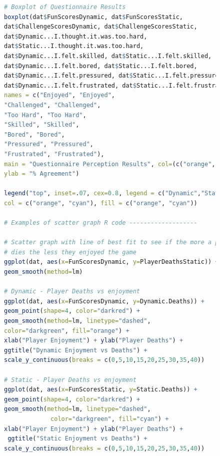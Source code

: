 \documentclass[journal]{IEEEtran}
\begin{document}
\begin{center}
\begin{figure}


\begin{lstlisting}[language=R]
# Boxplot of Questionnaire Results
boxplot(dat$FunScoresDynamic, dat$FunScoresStatic,
dat$ChallengeScoresDynamic, dat$ChallengeScoresStatic,
dat$Dynamic...I.thought.it.was.too.hard, 
dat$Static...I.thought.it.was.too.hard, 
dat$Dynamic...I.felt.skilled, dat$Static...I.felt.skilled,
dat$Dynamic...I.felt.bored, dat$Static...I.felt.bored,
dat$Dynamic...I.felt.pressured, dat$Static...I.felt.pressured,
dat$Dynamic...I.felt.frustrated, dat$Static...I.felt.frustrated,
names = c("Enjoyed", "Enjoyed",
"Challenged", "Challenged",
"Too Hard", "Too Hard", 
"Skilled", "Skilled",
"Bored", "Bored",
"Pressured", "Pressured",
"Frustrated", "Frustrated"), 
main = "Questionnaire Perception Results", col=(c("orange","cyan")), 
ylab = "% Agreement")

legend("top", inset=.07, cex=0.8, legend = c("Dynamic","Static") , 
col = c("orange", "cyan"), fill = c("orange", "cyan"))

# Examples of scatter graph R code -------------------

# Scatter graph with line of best fit to see if the more a player 
# dies the less they enjoyed the game
ggplot(dat, aes(x=FunScoresDynamic, y=PlayerDeathsStatic)) + geom_point() +
geom_smooth(method=lm)

# Dynamic - Player Deaths vs enjoyment
ggplot(dat, aes(x=FunScoresDynamic, y=Dynamic.Deaths)) + 
geom_point(shape=4, color="darkred") + 
geom_smooth(method=lm, linetype="dashed",
color="darkgreen", fill="orange") +
xlab("Player Enjoyment") + ylab("Player Deaths") + 
ggtitle("Dynamic Enjoyment vs Deaths") + 
scale_y_continuous(breaks = c(0,5,10,15,20,25,30,35,40))

# Static - Player Deaths vs enjoyment
ggplot(dat, aes(x=FunScoresStatic, y=Static.Deaths)) + 
geom_point(shape=4, color="darkred") + 
geom_smooth(method=lm, linetype="dashed",
             color="darkgreen", fill="cyan") +
xlab("Player Enjoyment") + ylab("Player Deaths") +
 ggtitle("Static Enjoyment vs Deaths") + 
scale_y_continuous(breaks = c(0,5,10,15,20,25,30,35,40))

\end{lstlisting}

\end{figure}

\end{center}






\end{document}
